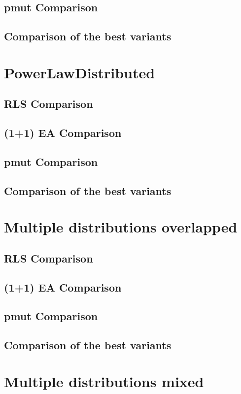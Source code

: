 \subsection{pmut Comparison}
\subsection{Comparison of the best variants}

\section{PowerLawDistributed}
\subsection{RLS Comparison}
\subsection{(1+1) EA Comparison}
\subsection{pmut Comparison}
\subsection{Comparison of the best variants}

\section{Multiple distributions overlapped}
\subsection{RLS Comparison}
\subsection{(1+1) EA Comparison}
\subsection{pmut Comparison}
\subsection{Comparison of the best variants}

\section{Multiple distributions mixed}
